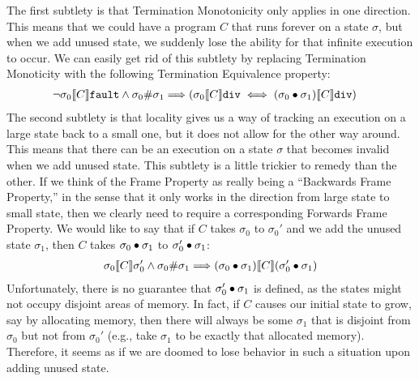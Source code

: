 The first subtlety is that Termination Monotonicity only applies in
one direction. This means that we could have a program $C$ that runs
forever on a state $\sigma$, but when we add unused state, we suddenly
lose the ability for that infinite execution to occur. We can easily
get rid of this subtlety by replacing Termination Monoticity with the
following Termination Equivalence property:
{\small
\begin{align*}
\lnot \relate{& \den{C}}{\sigma_0}{\fault} \land \sigma_0 \# \sigma_1 \Longrightarrow
  (\relate{\den{C}}{\sigma_0}{\dvg} \iff \relate{\den{C}}{(\sigma_0 \dt \sigma_1)}{\dvg})
\end{align*}}
\indent{}The second subtlety is that locality gives us a way of tracking an execution on a large state 
back to a small one, but it does not allow for the other way around. This means that there
can be an execution on a state $\sigma$ that becomes invalid when we add unused state. This 
subtlety is a little trickier to remedy than the other. If we think of the Frame Property as
really being a ``Backwards Frame Property,'' in the sense that it only works in the direction
from large state to small state, then we clearly need to require a corresponding Forwards
Frame Property. We would like to say that if $C$ takes $\sigma_0$ to $\sigma_0'$ and we add 
the unused state $\sigma_1$, then $C$ takes $\sigma_0 \dt \sigma_1$ to $\sigma_0' \dt \sigma_1$:
{\small
\begin{align*}
\relate{\den{C}}{\sigma_0}{\sigma_0'} \land \sigma_0 \# \sigma_1 \Longrightarrow 
  \relate{\den{C}}{(\sigma_0 \dt \sigma_1)}{(\sigma_0' \dt \sigma_1)}
\end{align*}}
\indent{}Unfortunately, there is no guarantee that $\sigma_0' \dt \sigma_1$ is defined, as the
states might not occupy disjoint areas of memory. In fact, if $C$ causes our initial state
to grow, say by allocating memory, then there will always be some $\sigma_1$ that is 
disjoint from $\sigma_0$ but not from $\sigma_0'$ (e.g., take $\sigma_1$ to be exactly that
allocated memory). Therefore, it seems as if we are doomed to lose behavior in such a situation
upon adding unused state.

